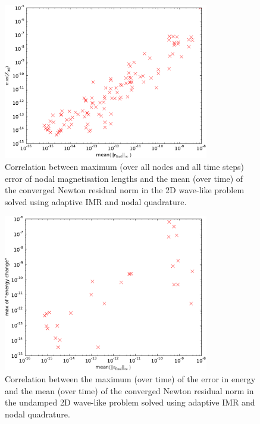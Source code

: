 \begin{figure}
  \centering
  \includegraphics[width=0.8\textwidth]
{plots/2d_wave_solution_m_length_newton_res/maxofmlengtherrormaxesvsmeanminofnewtonresiduals.pdf}
  \caption{Correlation between maximum (over all nodes and all time steps) error of nodal magnetisation lengths and the mean (over time) of the converged Newton residual norm in the 2D wave-like problem solved using adaptive IMR and nodal quadrature.
  }
  \label{fig:ml-error-2d-nodal-newton-tests}
\end{figure}


\begin{figure}
  \centering
  \includegraphics[width=0.8\textwidth]
  {plots/2d_wave_solution_energy_newton_res/maxofenergychangevsmeanminofnewtonresiduals.pdf}
  \caption{Correlation between the maximum (over time) of the error in energy and the mean (over time) of the converged Newton residual norm in the undamped 2D wave-like problem solved using adaptive IMR and nodal quadrature.
  }
  \label{fig:energy-error-2d-nodal-newton-tests}
\end{figure}




